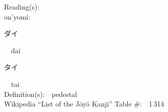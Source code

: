\begin{multicols}{2}
Reading(s):\ \ \\
{\hspace*{1em}}on'yomi:\ \ \\
{\hspace*{2em}}{\begin{CJK}{UTF8}{min} ダイ \end{CJK}}\ \ dai\ \ \\
{\hspace*{2em}}{\begin{CJK}{UTF8}{min} タイ \end{CJK}}\ \ tai\ \ \\
Definition(s):\ \ pedestal \\
Wikipedia ``List of the J\=oy\=o Kanji'' Table \#:\ \ 1\,314 \\
\ \ \\
\end{multicols}




